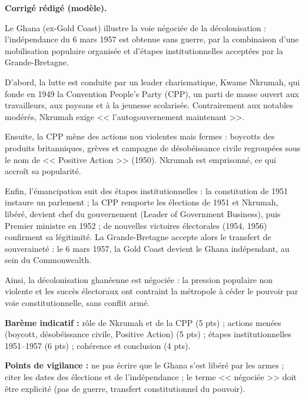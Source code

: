 \documentclass[11pt]{article}
\newcommand{\cle}[1]{{\popxbold\color{popdark}#1}}
\begin{document}
\begin{corrige}
\textbf{Corrigé rédigé (modèle).}

Le Ghana (ex-Gold Coast) illustre la voie négociée de la décolonisation : l'indépendance du 6 mars 1957 est obtenue sans guerre, par la combinaison d'une mobilisation populaire organisée et d'étapes institutionnelles acceptées par la Grande-Bretagne.

D'abord, la lutte est conduite par un leader charismatique, \cle{Kwame Nkrumah}, qui fonde en 1949 la \cle{Convention People's Party} (CPP), un parti de masse ouvert aux travailleurs, aux paysans et à la jeunesse scolarisée. Contrairement aux notables modérés, Nkrumah exige << l'autogouvernement maintenant >>.

Ensuite, la CPP mène des actions non violentes mais fermes : boycotts des produits britanniques, grèves et campagne de désobéissance civile regroupées sous le nom de << \cle{Positive Action} >> (1950). Nkrumah est emprisonné, ce qui accroît sa popularité.

Enfin, l'émancipation suit des étapes institutionnelles : la constitution de 1951 instaure un parlement ; la CPP remporte les élections de 1951 et Nkrumah, libéré, devient chef du gouvernement (Leader of Government Business), puis Premier ministre en 1952 ; de nouvelles victoires électorales (1954, 1956) confirment sa légitimité. La Grande-Bretagne accepte alors le transfert de souveraineté : le 6 mars 1957, la Gold Coast devient le Ghana indépendant, au sein du Commonwealth.

Ainsi, la décolonisation ghanéenne est négociée : la pression populaire non violente et les succès électoraux ont contraint la métropole à céder le pouvoir par voie constitutionnelle, sans conflit armé.

\textbf{Barème indicatif :} rôle de Nkrumah et de la CPP (5 pts) ; actions menées (boycott, désobéissance civile, Positive Action) (5 pts) ; étapes institutionnelles 1951--1957 (6 pts) ; cohérence et conclusion (4 pts).

\textbf{Points de vigilance :} ne pas écrire que le Ghana s'est libéré par les armes ; citer les dates des élections et de l'indépendance ; le terme << négociée >> doit être explicité (pas de guerre, transfert constitutionnel du pouvoir).
\end{corrige}
\end{document}
